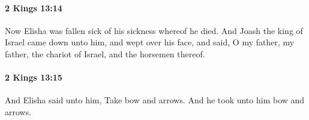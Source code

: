 		\paragraph{2 Kings 13:14} %
			\label{2KINGS-13-14}

			Now Elisha was fallen sick of his sickness whereof he died. And Joash the king of Israel came down unto him, and wept over his face, and said, O my father, my father, the chariot of Israel, and the horsemen thereof.


		\paragraph{2 Kings 13:15} %
			\label{2KINGS-13-15}

			And Elisha said unto him, Take bow and arrows. And he took unto him bow and arrows.


